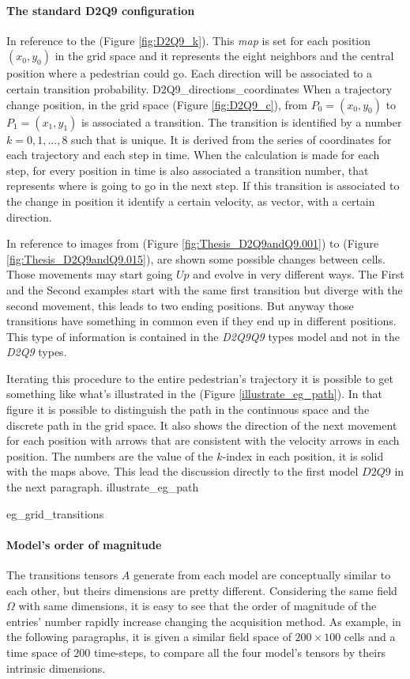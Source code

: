 \documentclass[class=article, crop=false]{standalone}
\begin{document}
\paragraph{The standard D2Q9 configuration} 
In reference to the (Figure \ref{fig:D2Q9_k}).
This \emph{map} is set for each position $(x_0, y_0)$ in the grid space and it represents the eight neighbors and the central position where a pedestrian could go.
Each direction will be associated to a certain transition probability.
	{D2Q9_directions_coordinates}
When a trajectory change position, in the grid space (Figure \ref{fig:D2Q9_c}), from $P_0=(x_0, y_0)$ to $P_1=(x_1, y_1)$ is associated a transition.
The transition is identified by a number $k = 0,1,...,8$ such that is unique.
It is derived from the series of coordinates for each trajectory and each step in time.
When the calculation is made for each step, for every position in time is also associated a transition number, that represents where is going to go in the next step.
If this transition is associated to the change in position it identify a certain velocity, as vector, with a certain direction.

In reference to images from (Figure \ref{fig:Thesis_D2Q9andQ9.001})  to  (Figure \ref{fig:Thesis_D2Q9andQ9.015}), are shown some possible changes between cells.
Those movements may start going $Up$ and evolve in very different ways.
The First and the Second examples start with the same first transition but diverge with the second movement, this leads to two ending positions.
But anyway those transitions have something in common even if they end up in different positions.
This type of information is contained in the \emph{D2Q9Q9} types model and not in the \emph{D2Q9} types.

Iterating this procedure to the entire pedestrian's trajectory it is possible to get something like what's illustrated in the (Figure \ref{illustrate_eg_path}).
In that figure it is possible to distinguish the path in the continuous space and the discrete path in the grid space.
It also shows the direction of the next movement for each position with arrows that are consistent with the velocity arrows in each position.
The numbers are the value of the $k$-index in each position, it is solid with the maps above.
This lead the discussion directly to the first model $D2Q9$ in the next paragraph.
	{illustrate_eg_path}

	{eg_grid_transitions}

\paragraph{Model's order of magnitude}
The transitions tensors $A$ generate from each model are conceptually similar to each other, but theirs dimensions are pretty different.
Considering the same field $\Omega$ with same dimensions, it is easy to see that the order of magnitude of the entries' number rapidly increase changing the acquisition method.
As example, in the following paragraphs, it is given a similar field space of $200\times100$ cells and a time space of $200$ time-steps, to compare all the four model's tensors by theirs intrinsic dimensions.
\end{document}
